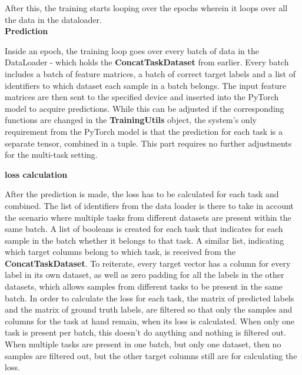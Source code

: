 After this, the training starts looping over the epochs wherein it loops over all the data in the dataloader. \\

\textbf{Prediction}

Inside an epoch, the training loop goes over every batch of data in the DataLoader - which holds the \textbf{ConcatTaskDataset} from earlier. Every batch includes a batch of feature matrices, a batch of correct target labels and a list of identifiers to which dataset each sample in a batch belongs. The input feature matrices are then sent to the specified device and inserted into the PyTorch model to acquire predictions. While this can be adjusted if the corresponding functions are changed in the \textbf{TrainingUtils} object, the system's only requirement from the PyTorch model is that the prediction for each task is a separate tensor, combined in a tuple. This part requires no further adjustments for the multi-task setting.

\textbf{loss calculation}

After the prediction is made, the loss has to be calculated for each task and combined. The list of identifiers from the data loader is there to take in account the scenario where multiple tasks from different datasets are present within the same batch. A list of booleans is created for each task that indicates for each sample in the batch whether it belongs to that task. A similar list, indicating which target columns belong to which task, is received from the \textbf{ConcatTaskDataset}. To reiterate, every target vector has a column for every label in its own dataset, as well as zero padding for all the labels in the other datasets, which allows samples from different tasks to be present in the same batch. In order to calculate the loss for each task, the matrix of predicted labels and the matrix of ground truth labels, are filtered so that only the samples and columns for the task at hand remain, when its loss is calculated. When only one task is present per batch, this doesn't do anything and nothing is filtered out. When multiple tasks are present in one batch, but only one dataset, then no samples are filtered out, but the other target columns still are for calculating the loss. \\

